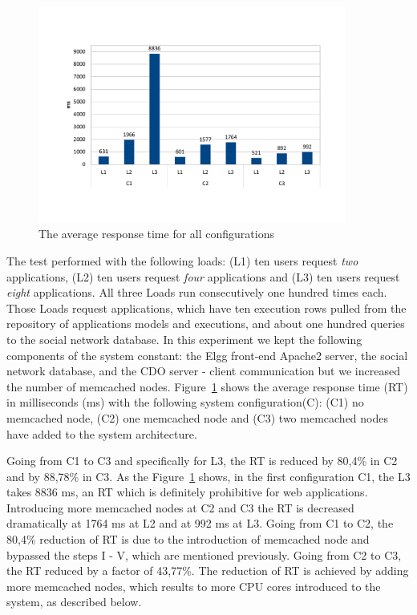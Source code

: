\begin{figure}[h]
	\centering
	\includegraphics[width=0.9\textwidth,natwidth=200,natheight=150]{./fig/RTavg.pdf}
	\caption{The average response time for all configurations}
	\label{fig:rtavg}
\end{figure}

The test performed with the following loads: (L1) ten users request \emph{two} applications, (L2) ten users request \emph{four} applications and (L3) ten users request \emph{eight} applications. All three Loads run consecutively one hundred times each. Those Loads request applications, which have ten execution rows pulled from the repository of applications models and executions, and about one hundred queries to the social network database. In this experiment we kept the following components of the system constant: the Elgg front-end Apache2 server, the social network database, and the CDO server - client communication but we increased the number of memcached nodes.
Figure~\ref{fig:rtavg} shows the  average response time (RT) in milliseconds (ms) with the following system configuration(C): (C1) no memcached node, (C2) one memcached node and (C3) two memcached nodes have added to the system architecture.

Going from C1 to C3 and specifically for L3, the RT is reduced by 80,4\% in C2 and by 88,78\% in C3. As the Figure~\ref{fig:rtavg} shows, in the first configuration C1, the L3 takes 8836 ms, an RT which is definitely prohibitive for web applications. Introducing more memcached nodes at C2 and C3 the RT is decreased dramatically at 1764 ms at L2 and at 992 ms at L3. Going from C1 to C2, the 80,4\% reduction of RT is due to the introduction of memcached node and bypassed the steps I - V, which are mentioned previously. Going from C2 to C3, the RT reduced by a factor of 43,77\%. The reduction of RT is achieved by adding more memcached nodes, which results to more CPU cores introduced to the system, as described below.

